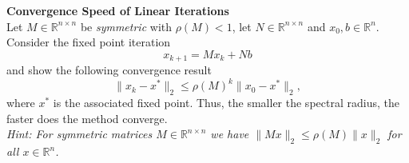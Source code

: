 \textbf{Convergence Speed of Linear Iterations}\\
Let $M \in \mathbb{R}^{n \times n}$ be \textit{symmetric} with $\rho(M) < 1$, let $N \in \mathbb{R}^{n \times n}$ and $x_0, b \in \mathbb{R}^n$. 
Consider the fixed point iteration 
$$
x_{k+1} = Mx_k + Nb 
$$ 
and show the following convergence result 
$$
\|x_k - x^*\|_2  \leq \rho(M)^k \|x_0 - x^*\|_2  ,
$$
where $x^*$ is the associated fixed point.
Thus, the smaller the spectral radius, the faster does the method converge.\\
[0.1cm]
\textit{Hint: For symmetric matrices $M\in \mathbb{R}^{n \times n}$ we have $\|Mx\|_2 \leq \rho(M) \|x\|_2$ for all $x\in \mathbb{R}^n$.} 	


